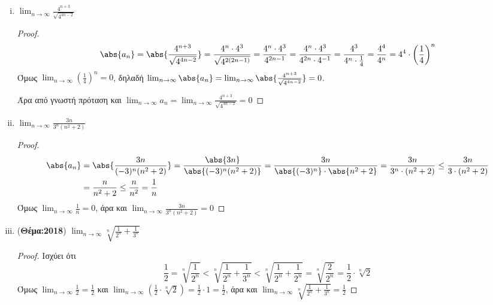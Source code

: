 \begin{enumerate}
\begin{enumerate}[i)]
            \item $ \lim_{n \to \infty} \frac{4^{n+3}}{\sqrt{4^{4n-2}}} $ 
                \begin{proof}
                    \[
                        \abs{a_{n}} = \abs{\frac{4^{n+3}}{\sqrt{4^{4n-2}}}} = 
                        \frac{4^{n}\cdot 4^{3}}{\sqrt{4^{2(2n-1)}}} = 
                        \frac{4^{n} \cdot 4^{3}}{4^{2n-1}} = 
                        \frac{4^{n}\cdot 4^{3}}{4^{2n}\cdot 4^{-1}} = 
                        \frac{4^{3}}{4^{n}\cdot 
                        \frac{1}{4}} = \frac{4^{4}}{4^{n}} = 4^{4}\cdot 
                        \left(\frac{1}{4} \right) ^{n}
                    \] 
                    Όμως $ \lim_{n \to \infty} \left(\frac{1}{4}\right)^{n} = 0  $, 
                    δηλαδή $ \lim_{n \to \infty} \abs{a_{n}} = \lim_{n \to \infty}
                    \abs{\frac{4^{n+3}}{\sqrt{4^{4n-2}}}} = 0 $. 

                    Άρα από γνωστή πρόταση και
                    $ \lim_{n \to \infty} a_{n} =  \lim_{n \to \infty} 
                    \frac{4^{n+3}}{\sqrt{4^{4n-2}}} = 0 $ 
                \end{proof}

            \item $ \lim_{n \to \infty} \frac{3n}{3^{n}(n^{2}+2)} $ 
                \begin{proof}
                    \begin{align*}
                        \abs{a_{n}} 
               &= \abs{\frac{3n}{(-3)^{n}(n^{2}+2)}} =
               \frac{\abs{3n}}{\abs{(-3)^{n}(n^{2}+2)}} = \frac{3n}{\abs{(-3)^{n}} \cdot
               \abs{n^{2}+2} } = \frac{3n}{3^{n}\cdot (n^{2}+2)} \leq 
               \frac{3n}{3\cdot (n^{2}+2)} \\ 
               &= \frac{n}{n^{2}+2} \leq \frac{n}{n^{2}} = \frac{1}{n} 
                    \end{align*} 
                Όμως $ \lim_{n \to \infty} \frac{1}{n} = 0 $, άρα και 
                $ \lim_{n \to \infty} \frac{3n}{3^{n}(n^{2}+2)} = 0 $
                \end{proof}

            \item ({\bfseries Θέμα:2018}) $ \lim_{n \to \infty} 
                \sqrt[n]{\frac{1}{2^{n}}+ \frac{1}{3^{n}}} $ 
                \begin{proof}
                    Ισχύει ότι 
                    \[
                        \frac{1}{2} = \sqrt[n]{\frac{1}{2^{n}}} < 
                        \sqrt[n]{\frac{1}{2^{n}} + \frac{1}{3^{n}} } < 
                        \sqrt[n]{\frac{1}{2^{n}} + \frac{1}{2^{n}}} = 
                        \sqrt[n]{\frac{2}{2^{n}}} = \frac{1}{2} \cdot \sqrt[n]{2} 
                    \] 
                Όμως $ \lim_{n \to \infty} \frac{1}{2} = \frac{1}{2} $ και 
                $ \lim_{n \to \infty} \left(\frac{1}{2} \cdot \sqrt[n]{2}\right) = 
                \frac{1}{2} \cdot 1 = \frac{1}{2} $, άρα και 
                $ \lim_{n \to \infty} \sqrt[n]{\frac{1}{2^{n}} + \frac{1}{3^{n}}} = 
                \frac{1}{2}  $
                \end{proof}


\end{enumerate}
\end{enumerate}
